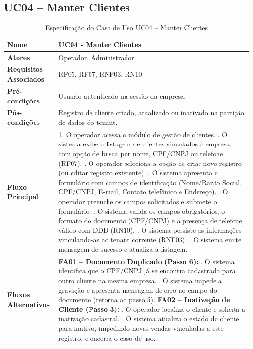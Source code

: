 \subsection{UC04 – Manter Clientes}

\begin{table}[H]
	\centering
	\caption{Especificação do Caso de Uso UC04 – Manter Clientes}
	\label{tab:uc04}
	\begin{tabular}{|p{3.5cm}|p{11.5cm}|}
		\hline
		\textbf{Nome} & UC04 - Manter Clientes \\ \hline
		\textbf{Atores} & Operador, Administrador \\ \hline
		\textbf{Requisitos Associados} & RF05, RF07, RNF03, RN10 \\ \hline
		\textbf{Pré-condições} & Usuário autenticado na sessão da empresa. \\ \hline
		\textbf{Pós-condições} & Registro de cliente criado, atualizado ou inativado na partição de dados do tenant. \\ \hline
		\textbf{Fluxo Principal} & 
		1. O operador acessa o módulo de gestão de clientes. \newline
		2. O sistema exibe a listagem de clientes vinculados à empresa, com opção de busca por nome, CPF/CNPJ ou telefone (RF07). \newline
		3. O operador seleciona a opção de criar novo registro (ou editar registro existente). \newline
		4. O sistema apresenta o formulário com campos de identificação (Nome/Razão Social, CPF/CNPJ, E-mail, Contato telefônico e Endereço). \newline
		5. O operador preenche os campos solicitados e submete o formulário. \newline
		6. O sistema valida os campos obrigatórios, o formato do documento (CPF/CNPJ) e a presença de telefone válido com DDD (RN10). \newline
		7. O sistema persiste as informações vinculando-as ao tenant corrente (RNF03). \newline
		8. O sistema emite mensagem de sucesso e atualiza a listagem. \\ \hline
		\textbf{Fluxos Alternativos} & 
		\textbf{FA01 – Documento Duplicado (Passo 6):} \newline
		1. O sistema identifica que o CPF/CNPJ já se encontra cadastrado para outro cliente na mesma empresa. \newline
		2. O sistema impede a gravação e apresenta mensagem de erro no campo do documento (retorna ao passo 5). \newline
		\textbf{FA02 – Inativação de Cliente (Passo 3):} \newline
		1. O operador localiza o cliente e solicita a inativação cadastral. \newline
		2. O sistema atualiza o estado do cliente para inativo, impedindo novas vendas vinculadas a este registro, e encerra o caso de uso. \\ \hline
	\end{tabular}
\end{table}

